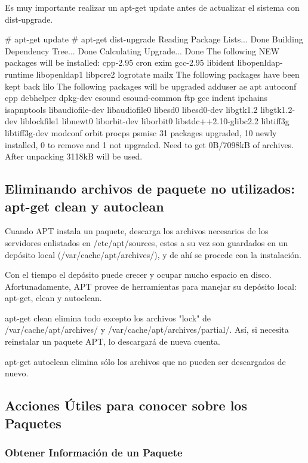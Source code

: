 \documentclass[12pt]{article}
\begin{document}
Es muy importante realizar un apt-get update antes de actualizar el sistema con dist-upgrade.

     # apt-get update
     # apt-get dist-upgrade
     Reading Package Lists... Done
     Building Dependency Tree... Done
     Calculating Upgrade... Done
     The following NEW packages will be installed:
       cpp-2.95 cron exim gcc-2.95 libident libopenldap-runtime libopenldap1
       libpcre2 logrotate mailx
     The following packages have been kept back
       lilo
     The following packages will be upgraded
       adduser ae apt autoconf cpp debhelper dpkg-dev esound esound-common ftp gcc
       indent ipchains isapnptools libaudiofile-dev libaudiofile0 libesd0
       libesd0-dev libgtk1.2 libgtk1.2-dev liblockfile1 libnewt0 liborbit-dev
       liborbit0 libstdc++2.10-glibc2.2 libtiff3g libtiff3g-dev modconf orbit
       procps psmisc
     31 packages upgraded, 10 newly installed, 0 to remove and 1 not upgraded.
     Need to get 0B/7098kB of archives. After unpacking 3118kB will be used.


\subsection*{Eliminando archivos de paquete no utilizados: apt-get clean y autoclean}

Cuando APT instala un paquete, descarga los archivos necesarios de los servidores enlistados en /etc/apt/sources, estos a su vez son guardados en un depósito local (/var/cache/apt/archives/), y de ahí se procede con la instalación.

Con el tiempo el depósito puede crecer y ocupar mucho espacio en disco. Afortunadamente, APT provee de herramientas para manejar su depósito local: apt-get, clean y autoclean.

apt-get clean elimina todo excepto los archivos "lock" de /var/cache/apt/archives/ y /var/cache/apt/archives/partial/. Así, si necesita reinstalar un paquete APT, lo descargará de nueva cuenta.

apt-get autoclean elimina sólo los archivos que no pueden ser descargados de nuevo.

\subsection*{Acciones Útiles para conocer sobre los Paquetes}
\subsubsection*{Obtener Información de un Paquete}
\end{document}
